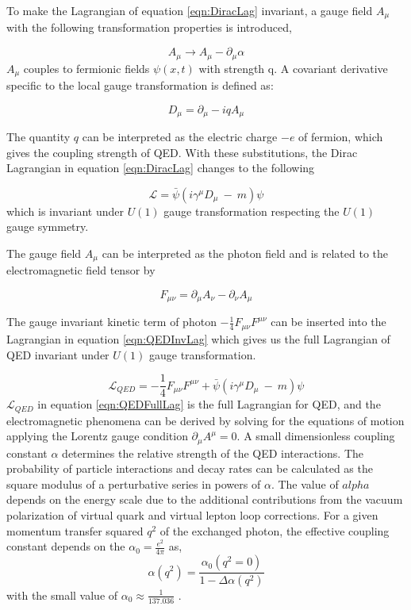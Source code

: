To make the Lagrangian of equation \ref{eqn:DiracLag} invariant, a gauge field $A_{\mu}$ with the following transformation properties is introduced, 

\begin{equation}
A_{\mu}\rightarrow A_{\mu} - \partial _{\mu} \alpha
\label{eqn:QEDGaugeField}
\end{equation}  
$A_{\mu}$ couples to fermionic fields $\psi(x,t)$ with strength q. A covariant derivative specific to the local gauge transformation is defined as:

\begin{equation}
D_{\mu} = \partial_{\mu} - iqA_{\mu}
\label{eqn:QEDCovDerv}
\end{equation}  

The quantity $q$ can be interpreted as the electric charge $-e$ of fermion, which gives the coupling strength of QED. With these substitutions, the Dirac Lagrangian in equation \ref{eqn:DiracLag} changes to the following

\begin{equation}
\mathcal{L} = \bar{\psi} ( i \gamma^{\mu} D_{\mu} ~-~ m) \psi
\label{eqn:QEDInvLag}
\end{equation}
which is invariant under $U(1)$ gauge transformation respecting the $U(1)$ gauge symmetry. 

The gauge field $A_{\mu}$ can be interpreted as the photon field and is related to the electromagnetic field tensor by

\begin{equation}
F_{\mu\nu} = \partial_{\mu}A_{\nu} - \partial_{\nu}A_{\mu}
\label{QEDFieldTensor}
\end{equation}

The gauge invariant kinetic term of photon $-\frac{1}{4}F_{\mu\nu}F^{\mu\nu}$ can be inserted into the Lagrangian in equation \ref{eqn:QEDInvLag} which gives us the full Lagrangian of QED invariant under $U(1)$ gauge transformation. 

\begin{equation}
\mathcal{L}_{QED} = -\frac{1}{4}F_{\mu\nu}F^{\mu\nu} + \bar{\psi} ( i \gamma^{\mu} D_{\mu} ~-~ m) \psi
\label{eqn:QEDFullLag}
\end{equation}
$\mathcal{L}_{QED}$ in equation \ref{eqn:QEDFullLag} is the full Lagrangian for QED, and the electromagnetic phenomena can be derived by solving for the equations of motion applying the Lorentz gauge condition $\partial_{\mu}A^{\mu}=0$. A small dimensionless coupling constant $\alpha$ determines the relative strength of the QED interactions. The probability of particle interactions and decay rates can be calculated as the square modulus of a perturbative series in powers of $\alpha$. The value of $alpha$ depends on the energy scale due to the additional contributions from the vacuum polarization of virtual quark and virtual lepton loop corrections. For a given momentum transfer squared $q^2$ of the exchanged photon, the effective coupling constant depends on the $\alpha_{0} = \frac{e^2}{4\pi}$ as, 
\begin{equation}
    \alpha(q^2) = \frac{\alpha_{0} (q^2=0)}{1-\Delta \alpha(q^2)}
\end{equation}
with the small value of $\alpha_{0} \approx \frac{1}{137.036}$ \cite{AlphaQED}.

